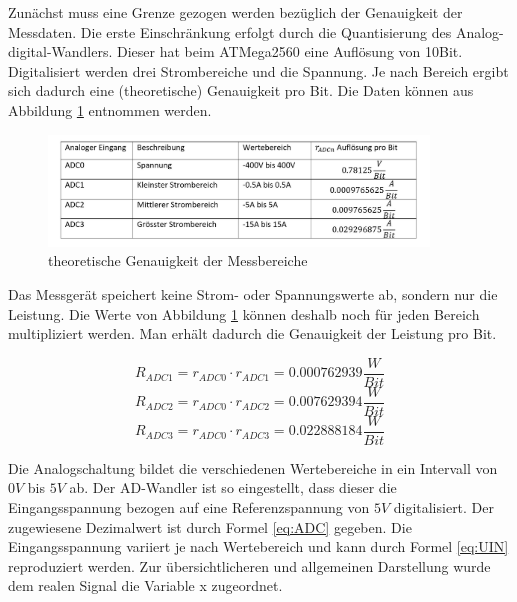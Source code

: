 Zunächst muss eine Grenze gezogen werden bezüglich der Genauigkeit der Messdaten. Die erste Einschränkung erfolgt durch die Quantisierung des Analog-digital-Wandlers. Dieser hat beim ATMega2560 eine Auflösung von 10Bit. Digitalisiert werden drei Strombereiche und die Spannung. Je nach Bereich ergibt sich dadurch eine (theoretische) Genauigkeit pro Bit. Die Daten können aus Abbildung \ref{fig:theoretische_Genauigkeit_der_Messbereiche} entnommen werden.

\begin{figure}[H]
\begin{center}
\includegraphics[width=0.9\textwidth]{images/Software_Tabelle_1.png}
\caption{theoretische Genauigkeit der Messbereiche}
\label{fig:theoretische_Genauigkeit_der_Messbereiche}
\end{center}
\end{figure}

Das Messgerät speichert keine Strom- oder Spannungswerte ab, sondern nur die Leistung. Die Werte von Abbildung \ref{fig:theoretische_Genauigkeit_der_Messbereiche} können deshalb noch für jeden Bereich multipliziert werden. Man erhält dadurch die Genauigkeit der Leistung pro Bit.

\begin{equation}
R_{ADC1}=r_{ADC0}\cdot r_{ADC1}= 0.000762939\frac{W}{Bit}
\label{eq:RADC1}
\end{equation}
\begin{equation}
R_{ADC2}=r_{ADC0}\cdot r_{ADC2}= 0.007629394\frac{W}{Bit}
\label{eq:RADC2}
\end{equation}
\begin{equation}
R_{ADC3}=r_{ADC0}\cdot r_{ADC3}= 0.022888184\frac{W}{Bit}
\label{eq:RADC3}
\end{equation}

Die Analogschaltung bildet die verschiedenen Wertebereiche in ein Intervall von $0V$ bis $5V$ ab. Der AD-Wandler ist so eingestellt, dass dieser die Eingangsspannung bezogen auf eine Referenzspannung von $5V$ digitalisiert. Der zugewiesene Dezimalwert ist durch Formel \ref{eq:ADC} gegeben. Die Eingangsspannung variiert je nach Wertebereich und kann durch Formel \ref{eq:UIN} reproduziert werden. Zur übersichtlicheren und allgemeinen Darstellung wurde dem realen Signal die Variable x zugeordnet.

